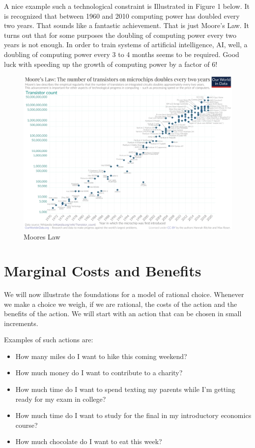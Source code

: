 \documentclass[
]{book}
\providecommand{\tightlist}{%
  \setlength{\itemsep}{0pt}\setlength{\parskip}{0pt}}
\begin{document}
A nice example such a technological constraint is Illustrated in Figure 1 below. It is recognized that between 1960 and 2010 computing power has doubled every two years. That sounds like a fantastic achievement. That is just Moore's Law. It turns out that for some purposes the doubling of computing power every two years is not enough. In order to train systems of artificial intelligence, AI, well, a doubling of computing power every 3 to 4 months seems to be required. Good luck with speeding up the growth of computing power by a factor of 6!

\begin{figure}

{\centering \includegraphics[width=1\linewidth]{img/rationalchoice/moore} 

}

\caption{Moores Law}\label{fig:rationalchoice1}
\end{figure}

\hypertarget{marginal-costs-and-benefits}{%
\section{Marginal Costs and Benefits}\label{marginal-costs-and-benefits}}

We will now illustrate the foundations for a model of rational choice. Whenever we make a choice we weigh, if we are rational, the costs of the action and the benefits of the action. We will start with an action that can be chosen in small increments.

Examples of such actions are:

\begin{itemize}
\tightlist
\item
  How many miles do I want to hike this coming weekend?
\item
  How much money do I want to contribute to a charity?
\item
  How much time do I want to spend texting my parents while I'm getting ready for my exam in college?
\item
  How much time do I want to study for the final in my introductory economics course?
\item
  How much chocolate do I want to eat this week?
\end{itemize}
\end{document}
